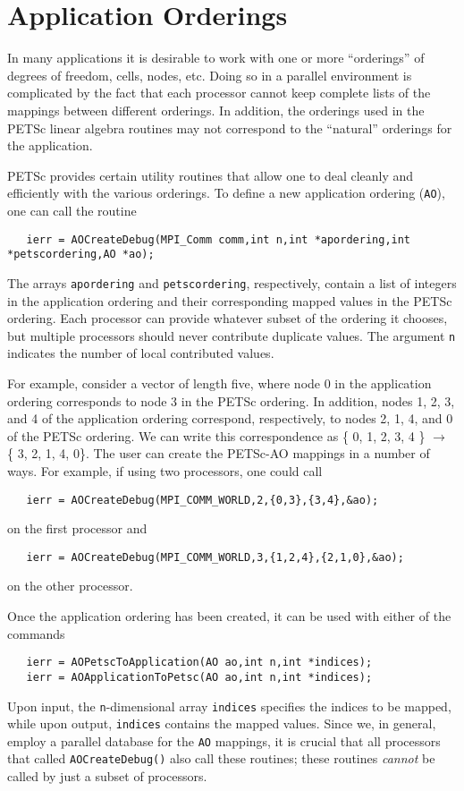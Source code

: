 \section{Application Orderings}
\label{sec:ao}
 

In many applications it is desirable to work with one or more ``orderings''
of degrees of freedom, cells, nodes, etc.  Doing so in a parallel environment is
complicated by the fact that each processor cannot keep 
complete lists of the mappings between different orderings. In addition, 
the orderings used in the PETSc linear algebra routines may not correspond to the 
``natural'' orderings for the application.

PETSc provides certain utility routines that allow one to deal cleanly
and efficiently with the various orderings. To define a new application ordering
({\tt AO}), one can call the routine 
\begin{verbatim}
   ierr = AOCreateDebug(MPI_Comm comm,int n,int *apordering,int *petscordering,AO *ao);
\end{verbatim}
The  
arrays {\tt apordering} and {\tt petscordering}, respectively, contain a list of integers
in the application ordering and their corresponding mapped values in the PETSc 
ordering. Each processor can provide whatever subset of the ordering it 
chooses, but multiple processors should never contribute duplicate values. 
The argument {\tt n} indicates the number of local contributed values.

For example, consider a vector of length five, where node 0 in the application ordering
corresponds to node 3 in the PETSc ordering.  In addition, nodes 1, 2, 3, and 4 of
the application ordering correspond, respectively, to nodes 2, 1, 4, and 0 of
the PETSc ordering.
We can write this correspondence as \{ 0, 1, 2, 3, 4 \} $ \rightarrow $ \{ 3, 2, 1, 4, 0\}. 
The user can create the PETSc-AO mappings in a number of ways.  For example,
if using two processors, one could call
\begin{verbatim}
   ierr = AOCreateDebug(MPI_COMM_WORLD,2,{0,3},{3,4},&ao);
\end{verbatim}
on the first processor and 
\begin{verbatim}
   ierr = AOCreateDebug(MPI_COMM_WORLD,3,{1,2,4},{2,1,0},&ao);
\end{verbatim}
on the other processor.

Once the application ordering has been created, it can be used
with either of the commands
\begin{verbatim}
   ierr = AOPetscToApplication(AO ao,int n,int *indices);
   ierr = AOApplicationToPetsc(AO ao,int n,int *indices);
\end{verbatim}
Upon input, the {\tt n}-dimensional array {\tt indices} specifies 
the indices to be mapped, while upon output, {\tt indices} contains
the mapped values.
 
Since we, in general, employ a parallel database for the
{\tt AO} mappings, it is crucial that all processors that
called {\tt AOCreateDebug()} also call these routines; these
routines {\em cannot} be called by just a subset of processors.

